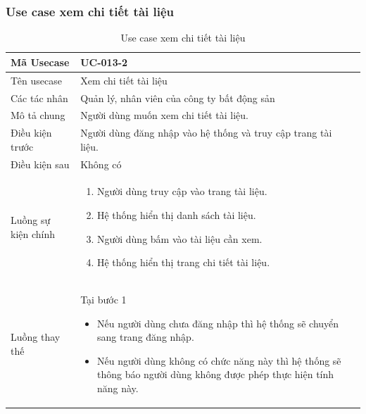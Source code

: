 \documentclass[12pt,a4paper]{article}
\begin{document}
    \subsubsection*{Use case xem chi tiết tài liệu }
    \begin{table}[H]
        \centering
        \begin{tabular}{|p{3.5cm}|p{11.5cm}|c|}
            \hline
            Mã Usecase      & UC-013-2                                                      \\
            \hline
            Tên usecase     & Xem chi tiết tài liệu                                         \\
            \hline
            Các tác nhân    & Quản lý, nhân viên của công ty bất động sản                   \\
            \hline
            Mô tả chung     & Người dùng muốn xem chi tiết tài liệu.                        \\
            \hline

            Điều kiện trước & Người dùng đăng nhập vào hệ thống và truy cập trang tài liệu. \\
            \hline

            Điều kiện sau   & Không có                                                      \\
            \hline

            Luồng sự kiện chính & \vspace{-.8cm}\begin{enumerate}
                                                    \item Người dùng truy cập vào trang tài liệu.
                                                    \item Hệ thống hiển thị danh sách tài liệu.
                                                    \item Người dùng bấm vào tài liệu cần xem.
                                                    \item Hệ thống hiển thị trang chi tiết tài liệu.
            \end{enumerate}
            \\
            \hline
            Luồng thay thế & Tại bước 1\newline
            \vspace{-.8cm}\begin{itemize}
                              \item Nếu người dùng chưa đăng nhập thì hệ thống sẽ chuyển sang trang đăng nhập.
                              \item  Nếu người dùng không có chức năng này thì hệ thống sẽ thông báo người dùng không được phép thực hiện tính năng này.
            \end{itemize}

            \\    \hline
        \end{tabular}
        \caption{Use case xem chi tiết tài liệu }
    \end{table}
\end{document}
